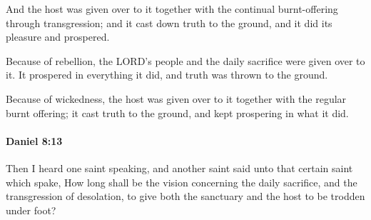 			\begin{versebox}
					\item[BHS] 
					\item[LXX] 
					\item[ASV] And the host was given over to it together with the continual burnt-offering through transgression; and it cast down truth to the ground, and it did its pleasure and prospered.
					\item[NIV] Because of rebellion, the LORD’s people and the daily sacrifice were given over to it. It prospered in everything it did, and truth was thrown to the ground.
					\item[NRSV] Because of wickedness, the host was given over to it together with the regular burnt offering; it cast truth to the ground, and kept prospering in what it did.
			\end{versebox}

		\paragraph{Daniel 8:13} %
			\label{DANIEL-8-13}

			Then I heard one saint speaking, and another saint said unto that certain saint which spake, How long shall be the vision concerning the daily sacrifice, and the transgression of desolation, to give both the sanctuary and the host to be trodden under foot?

